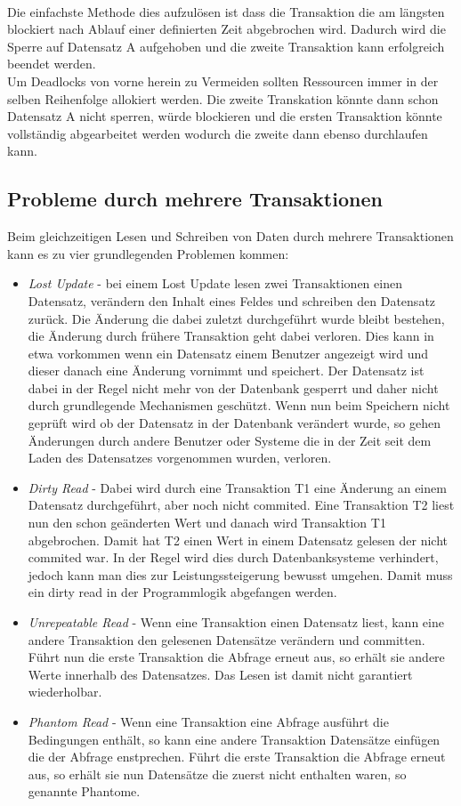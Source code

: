 \\Die einfachste Methode dies aufzulösen ist dass die Transaktion die am längsten blockiert nach Ablauf einer definierten Zeit abgebrochen wird. Dadurch wird die Sperre auf Datensatz A aufgehoben und die zweite Transaktion kann erfolgreich beendet werden.\parencite[S. 139ff]{WeikumVossen02}
\\Um Deadlocks von vorne herein zu Vermeiden sollten Ressourcen immer in der selben Reihenfolge allokiert werden. Die zweite Transkation könnte dann schon Datensatz A nicht sperren, würde blockieren und die ersten Transaktion könnte vollständig abgearbeitet werden wodurch die zweite dann ebenso durchlaufen kann.


\subsection{Probleme durch mehrere Transaktionen}
Beim gleichzeitigen Lesen und Schreiben von Daten durch mehrere Transaktionen kann es zu vier grundlegenden Problemen kommen:
\begin{itemize}
	\item \emph{Lost Update} - bei einem Lost Update lesen zwei Transaktionen einen Datensatz, verändern den Inhalt eines Feldes und schreiben den Datensatz zurück. Die Änderung die dabei zuletzt durchgeführt wurde bleibt bestehen, die Änderung durch frühere Transaktion geht dabei verloren. Dies kann in etwa vorkommen wenn ein Datensatz einem Benutzer angezeigt wird und dieser danach eine Änderung vornimmt und speichert. Der Datensatz ist dabei in der Regel nicht mehr von der Datenbank gesperrt und daher nicht durch grundlegende Mechanismen geschützt. Wenn nun beim Speichern nicht geprüft wird ob der Datensatz in der Datenbank verändert wurde, so gehen Änderungen durch andere Benutzer oder Systeme die in der Zeit seit dem Laden des Datensatzes vorgenommen wurden, verloren.\parencite[S. 415f]{dbgrund}
	\item \emph{Dirty Read} - Dabei wird durch eine Transaktion T1 eine Änderung an einem Datensatz durchgeführt, aber noch nicht commited. Eine Transaktion T2 liest nun den schon geänderten Wert und danach wird Transaktion T1 abgebrochen. Damit hat T2 einen Wert in einem Datensatz gelesen der nicht commited war. In der Regel wird dies durch Datenbanksysteme verhindert, jedoch kann man dies zur Leistungssteigerung bewusst umgehen. Damit muss ein dirty read in der Programmlogik abgefangen werden.\parencite[S. 439]{dbgrund}
	\item \emph{Unrepeatable Read} - Wenn eine Transaktion einen Datensatz liest, kann eine andere Transaktion den gelesenen Datensätze verändern und committen. Führt nun die erste Transaktion die Abfrage erneut aus, so erhält sie andere Werte innerhalb des Datensatzes. Das Lesen ist damit nicht garantiert wiederholbar.\parencite[S. 439]{dbgrund}
	\item \emph{Phantom Read} - Wenn eine Transaktion eine Abfrage ausführt die Bedingungen enthält, so kann eine andere Transaktion Datensätze einfügen die der Abfrage enstprechen. Führt die erste Transaktion die Abfrage erneut aus, so erhält sie nun Datensätze die zuerst nicht enthalten waren, so genannte Phantome.\parencite[S. 439]{dbgrund}	
\end{itemize}
